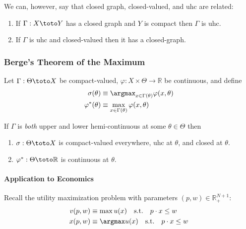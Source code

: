 \documentclass{article}
\begin{document}
We can, however, say that closed graph, closed-valued, and uhc are related:
\begin{claim}
  \begin{enumerate}
    \item If $\Gamma: X \toto Y$ has a closed graph and $Y$ is compact then $\Gamma$ is uhc.

    \item If $\Gamma$ is uhc and closed-valued then it has a closed-graph.
  \end{enumerate}
\end{claim}

\subsubsection{Berge's Theorem of the Maximum}
\label{ssub:berge_s_theorem_of_the_maximum}

\begin{theorem}\label{thm:lecture4_correspondences_maximum_theorem}
  Let $\Gamma: \Theta \toto X$ be compact-valued, $\varphi: X \times \Theta \to \mathbb{R}$ be continuous, and define
  \begin{align*}
    \sigma(\theta)
    &
    \equiv
    \argmax_{x \in \Gamma(\theta)}
    \varphi(x, \theta)
    \\
    \varphi^*(\theta)
    &
    \equiv
    \max_{x \in \Gamma(\theta)}
    \varphi(x, \theta)
  \end{align*}

  If $\Gamma$ is \textit{both} upper and lower hemi-continuous at some $\theta \in \Theta$ then
  \begin{enumerate}
    \item $\sigma: \Theta \toto X$ is compact-valued everywhere, uhc at $\theta$, and closed at $\theta$.

    \item $\varphi^*: \Theta \toto \mathbb{R}$ is continuous at $\theta$.
  \end{enumerate}
\end{theorem}

\paragraph{Application to Economics}
\label{par:application_to_economics}

Recall the utility maximization problem with parameters $(p, w) \in \mathbb{R}^{N + 1}_{+}$:
\begin{align*}
  v(p, w)
  &
  \equiv
  \max u(x)
  \quad
  \text{s.t.}
  \quad
  p \cdot x \le w
  \\
  x(p, w)
  &
  \equiv
  \argmax u(x)
  \quad
  \text{s.t.}
  \quad
  p \cdot x \le w
\end{align*}
\end{document}
